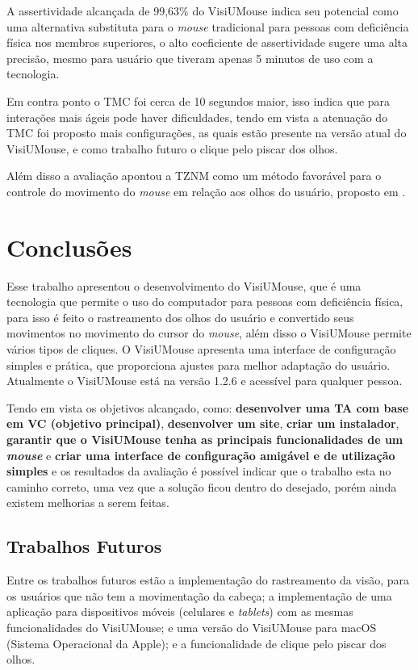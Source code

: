 A assertividade alcançada de 99,63\% do VisiUMouse indica seu potencial como uma alternativa substituta para o \textit{mouse} tradicional para pessoas com deficiência física nos membros superiores, o alto coeficiente de assertividade sugere uma alta precisão, mesmo para usuário que tiveram apenas 5 minutos de uso com a tecnologia.

Em contra ponto o TMC foi cerca de 10 segundos maior, isso indica que para interações mais ágeis pode haver dificuldades, tendo em vista a atenuação do TMC foi proposto mais configurações, as quais estão presente na versão atual do VisiUMouse, e como trabalho futuro o clique pelo piscar dos olhos.

Além disso a avaliação apontou a TZNM como um método favorável para o controle do movimento do \textit{mouse} em relação aos olhos do usuário, proposto em \cite{xavier2017visiumouse}.


\chapter{Conclusões}\label{CAP-consideracoes-finais-trabalhos-futuros}
Esse trabalho apresentou o desenvolvimento do VisiUMouse, que é uma tecnologia que permite o uso do computador para pessoas com deficiência física, para isso é feito o rastreamento dos olhos do usuário e convertido seus movimentos no movimento do cursor do \textit{mouse}, além disso o VisiUMouse permite vários tipos de cliques. O VisiUMouse apresenta uma interface de configuração simples e prática, que proporciona ajustes para melhor adaptação do usuário. Atualmente o VisiUMouse está na versão 1.2.6 e acessível para qualquer pessoa.

Tendo em vista os objetivos alcançado, como: \textbf{desenvolver uma TA com base em VC (objetivo principal)}, \textbf{desenvolver um site}, \textbf{criar um instalador}, \textbf{garantir que o VisiUMouse tenha as principais funcionalidades de um \textit{mouse}} e \textbf{criar uma interface de configuração amigável e de utilização simples} e os resultados da avaliação é possível indicar que o trabalho esta no caminho correto, uma vez que a solução ficou dentro do desejado, porém ainda existem melhorias a serem feitas.

\section{Trabalhos Futuros}

Entre os trabalhos futuros estão a implementação do rastreamento da visão, para os usuários que não tem a movimentação da cabeça; a implementação de uma aplicação para dispositivos móveis (celulares e \textit{tablets}) com as mesmas funcionalidades do VisiUMouse; e uma versão do VisiUMouse para macOS (Sistema Operacional da Apple); e a funcionalidade de clique pelo piscar dos olhos.

